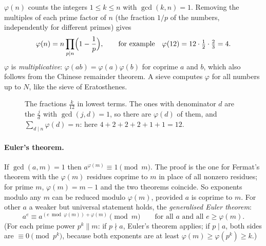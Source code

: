  $\varphi(n)$ counts the integers $1 \le k \le n$ with $\gcd(k, n) = 1$. Removing the multiples of each prime factor
of $n$ (the fraction $1/p$ of the numbers, independently for different primes) gives
\[
  \varphi(n) = n \prod_{p \mid n} \Bigl(1 - \frac{1}{p}\Bigr), \qquad\text{for example}\quad \varphi(12) = 12 \cdot \tfrac12 \cdot
  \tfrac23 = 4 .
\]
$\varphi$ is \emph{multiplicative}: $\varphi(ab) = \varphi(a)\varphi(b)$ for coprime $a$ and $b$, which also follows from the Chinese
remainder theorem. A sieve computes $\varphi$ for all numbers up to $N$, like the sieve of Eratosthenes.


\begin{figure}[htbp]
\centering
{}
\caption{The fractions $\frac{k}{12}$ in lowest terms. The ones with denominator $d$ are the $\frac{j}{d}$ with $\gcd(j, d) = 1$, so
there are $\varphi(d)$ of them, and $\sum_{d \mid n} \varphi(d) = n$: here $4 + 2 + 2 + 2 + 1 + 1 = 12$.}
\label{fig:totient}
\end{figure}

\paragraph{Euler's theorem.} If $\gcd(a, m) = 1$ then $a^{\varphi(m)} \equiv 1 \pmod m$. The proof is the one for Fermat's theorem with
the $\varphi(m)$ residues coprime to $m$ in place of all nonzero residues; for prime $m$, $\varphi(m) = m - 1$ and the two theorems
coincide. So exponents modulo any $m$ can be reduced modulo $\varphi(m)$, provided $a$ is coprime to $m$. For other $a$ a weaker but
universal statement holds, the \emph{generalised Euler theorem}:
\[
  a^{e} \equiv a^{(e \bmod \varphi(m)) + \varphi(m)} \pmod m \qquad\text{for all } a \text{ and all } e \ge \varphi(m) .
\]
(For each prime power $p^k \| m$: if $p \nmid a$, Euler's theorem applies; if $p \mid a$, both sides are $\equiv 0 \pmod{p^k}$, because
both exponents are at least $\varphi(m) \ge \varphi(p^k) \ge k$.)

